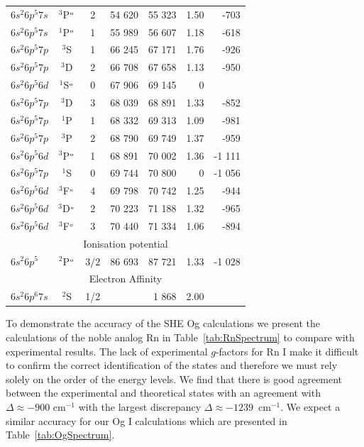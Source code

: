 \documentclass[10pt,a4paper, twoside, openright]{report}
\begin{document}
{\begin{longtable}{l@{\hspace{0.5cm}}cc@{\hspace{0.5cm}}r@{\hspace{0.5cm}}r@{\hspace{0.5cm}}r@{\hspace{0.5cm}}r@{\hspace{0.5cm}}}
$6s^2 6p^5 7s$ &    $^3$P$^{\rm_o}$         & 2  &  54 620  &  55 323     &  1.50     &  -703    \\
$6s^2 6p^5 7s$ &  $^1$P$^{\rm_o}$  & 1 &   55 989  & 56 607   &  1.18      &   -618    \\
$6s^2 6p^5 7p$ & $^3$S  &  1 &   66 245 & 67 171   & 1.76      &   -926     \\
$6s^2 6p^5 7p$ & $^3$D &  2 &   66 708 & 67 658  & 1.13     &   -950      \\
$6s^2 6p^5 6d$ & $^1$S$^{\rm_o}$ &   0 &  67 906  &   69 145  &  0          \\
$6s^2 6p^5 7p$ & $^3$D &  3 &   68 039  &  68 891  &  1.33      &   -852      \\
$6s^2 6p^5 7p$ & $^1$P & 1 &   68 332 &  69 313   & 1.09      & -981     \\
$6s^2 6p^5 7p$ & $^3$P &  2 &   68 790 &  69 749   & 1.37       &  -959    \\
$6s^2 6p^5 6d$ & $^3$P$^{\rm_o}$ &  1 &  68 891  & 70 002     &   1.36    & -1 111  \\
$6s^2 6p^5 7p$ & $^1$S &  0 &   69 744    &   70 800    &   0    &   -1 056      \\
$6s^2 6p^5 6d$ & $^3$F$^{\rm_o}$ &  4 &    69 798   &   70 742     &  1.25    &  -944   \\
$6s^2 6p^5 6d$ &  $^3$D$^{\rm_o}$ &  2     &   70 223   &  71 188 &   1.32    &   -965  \\
$6s^2 6p^5 6d$ & $^3$F$^{\rm_o}$ &  3 & 70 440  &  71 334 &  1.06     &    -894       \\
\multicolumn{7}{c}{Ionisation potential} \\
$6s^2 6p^5$ & $^2$P$^{\rm_o}$ & $3/2$ & 86 693 & 87 721 & 1.33 & -1 028   \\
\multicolumn{7}{c}{Electron Affinity} \\
$6s^2 6p^6 7s$ &   $^2$S & 1/2 &  & 1 868 & 2.00 &    \\
\bottomrule
\bottomrule
\end{longtable}
}
To demonstrate the accuracy of the SHE Og calculations we present the calculations of the noble analog Rn in Table~\ref{tab:RnSpectrum} to compare with experimental results. The lack of experimental $g$-factors for Rn I make it difficult to confirm the correct identification of the states and therefore we must rely solely on the order of the energy levels. We find that there is good agreement between the experimental and theoretical states with an agreement with  $\Delta \approx -900$ cm$^{-1}$ with the largest discrepancy   $\Delta \approx -1239 $~cm$^{-1}$. We expect a similar accuracy for our Og I calculations which are presented in Table~\ref{tab:OgSpectrum}. \\
\end{document}
